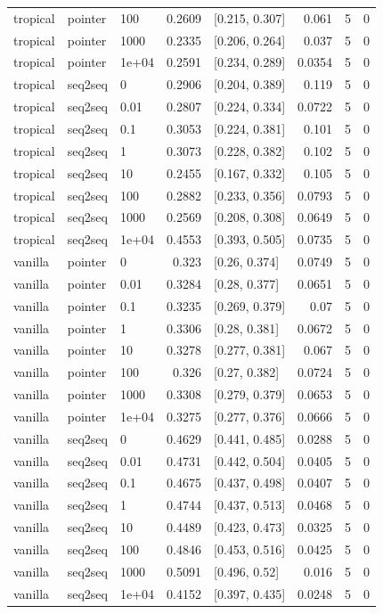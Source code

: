 \documentclass[10pt]{article}
\begin{document}
{\begin{longtable}{lllrlrrr}
tropical & pointer & 100 & 0.2609 & [0.215, 0.307] & 0.061 & 5 & 0\\
tropical & pointer & 1000 & 0.2335 & [0.206, 0.264] & 0.037 & 5 & 0\\
tropical & pointer & 1e+04 & 0.2591 & [0.234, 0.289] & 0.0354 & 5 & 0\\
tropical & seq2seq & 0 & 0.2906 & [0.204, 0.389] & 0.119 & 5 & 0\\
tropical & seq2seq & 0.01 & 0.2807 & [0.224, 0.334] & 0.0722 & 5 & 0\\
tropical & seq2seq & 0.1 & 0.3053 & [0.224, 0.381] & 0.101 & 5 & 0\\
tropical & seq2seq & 1 & 0.3073 & [0.228, 0.382] & 0.102 & 5 & 0\\
tropical & seq2seq & 10 & 0.2455 & [0.167, 0.332] & 0.105 & 5 & 0\\
tropical & seq2seq & 100 & 0.2882 & [0.233, 0.356] & 0.0793 & 5 & 0\\
tropical & seq2seq & 1000 & 0.2569 & [0.208, 0.308] & 0.0649 & 5 & 0\\
tropical & seq2seq & 1e+04 & 0.4553 & [0.393, 0.505] & 0.0735 & 5 & 0\\
vanilla & pointer & 0 & 0.323 & [0.26, 0.374] & 0.0749 & 5 & 0\\
vanilla & pointer & 0.01 & 0.3284 & [0.28, 0.377] & 0.0651 & 5 & 0\\
vanilla & pointer & 0.1 & 0.3235 & [0.269, 0.379] & 0.07 & 5 & 0\\
vanilla & pointer & 1 & 0.3306 & [0.28, 0.381] & 0.0672 & 5 & 0\\
vanilla & pointer & 10 & 0.3278 & [0.277, 0.381] & 0.067 & 5 & 0\\
vanilla & pointer & 100 & 0.326 & [0.27, 0.382] & 0.0724 & 5 & 0\\
vanilla & pointer & 1000 & 0.3308 & [0.279, 0.379] & 0.0653 & 5 & 0\\
vanilla & pointer & 1e+04 & 0.3275 & [0.277, 0.376] & 0.0666 & 5 & 0\\
vanilla & seq2seq & 0 & 0.4629 & [0.441, 0.485] & 0.0288 & 5 & 0\\
vanilla & seq2seq & 0.01 & 0.4731 & [0.442, 0.504] & 0.0405 & 5 & 0\\
vanilla & seq2seq & 0.1 & 0.4675 & [0.437, 0.498] & 0.0407 & 5 & 0\\
vanilla & seq2seq & 1 & 0.4744 & [0.437, 0.513] & 0.0468 & 5 & 0\\
vanilla & seq2seq & 10 & 0.4489 & [0.423, 0.473] & 0.0325 & 5 & 0\\
vanilla & seq2seq & 100 & 0.4846 & [0.453, 0.516] & 0.0425 & 5 & 0\\
vanilla & seq2seq & 1000 & 0.5091 & [0.496, 0.52] & 0.016 & 5 & 0\\
vanilla & seq2seq & 1e+04 & 0.4152 & [0.397, 0.435] & 0.0248 & 5 & 0\\
\bottomrule
\end{longtable}
}
\end{document}
